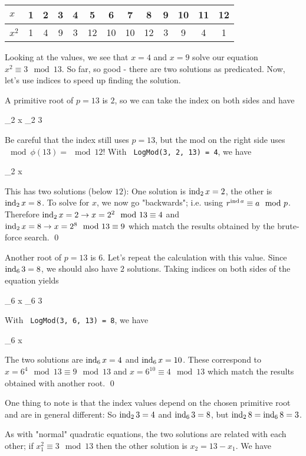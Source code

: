 \begin{tabular}{lcccccccccccc}
    $x$   & 1 & 2 & 3 & 4 & 5  & 6  & 7  & 8  & 9 & 10 & 11 & 12 \\ \hline
    $x^2$ & 1 & 4 & 9 & 3 & 12 & 10 & 10 & 12 & 3 & 9  & 4  & 1 
\end{tabular}

\vspace{2mm}

Looking at the values, we see that $x = 4$ and $x = 9$ solve our equation $x^2 \equiv 3 \mod 13$. So far, so good - there are two solutions as predicated. Now, let's use indices to speed up finding the solution.

A primitive root of $p=13$ is $2$, so we can take the index on both sides and have

 \ind_2 x \equiv \ind_2 3 
\eee

Be careful that the index still uses $p=13$, but the mod on the right side uses $\mod \phi(13) = \mod 12$! With \verb+ LogMod(3, 2, 13) = 4+, we have

 \ind_2 x  
\eee

This has two solutions (below $12$): One solution is $\operatorname{ind}_2 x = 2$, the other is $\operatorname{ind}_2 x = 8$. To solve for $x$, we now go "backwards"; i.e. using $r^{\operatorname{ind} a} \equiv a \mod p$. Therefore $\operatorname{ind}_2 x = 2 \rightarrow x = 2^2 \mod 13 \equiv 4$ and $\operatorname{ind}_2 x = 8 \rightarrow x = 2^8 \mod 13 \equiv 9$ which match the results obtained by the brute-force search. \qed

Another root of $p=13$ is $6$. Let's repeat the calculation with this value. Since $\operatorname{ind}_6 3 = 8$, we should also have $2$ solutions. Taking indices on both sides of the equation yields

 \ind_6 x \equiv \ind_6 3 
\eee

With \verb+ LogMod(3, 6, 13) = 8+, we have

 \ind_6 x  
\eee

The two solutions are $\operatorname{ind}_6 x = 4$ and $\operatorname{ind}_6 x = 10$. These correspond to $x = 6^4 \mod 13 \equiv 9 \mod 13$ and $x = 6^{10} \equiv 4 \mod 13$ which match the results obtained with another root. \qed

One thing to note is that the index values depend on the chosen primitive root and are in general different: So $\operatorname{ind}_2 3 = 4$ and $\operatorname{ind}_6 3 = 8$, but $\operatorname{ind}_2 8 = \operatorname{ind}_6 8 = 3$.

As with "normal" quadratic equations, the two solutions are related with each other; if $x_1^2 \equiv 3 \mod 13$ then the other solution is $x_2 = 13-x_1$. We have

